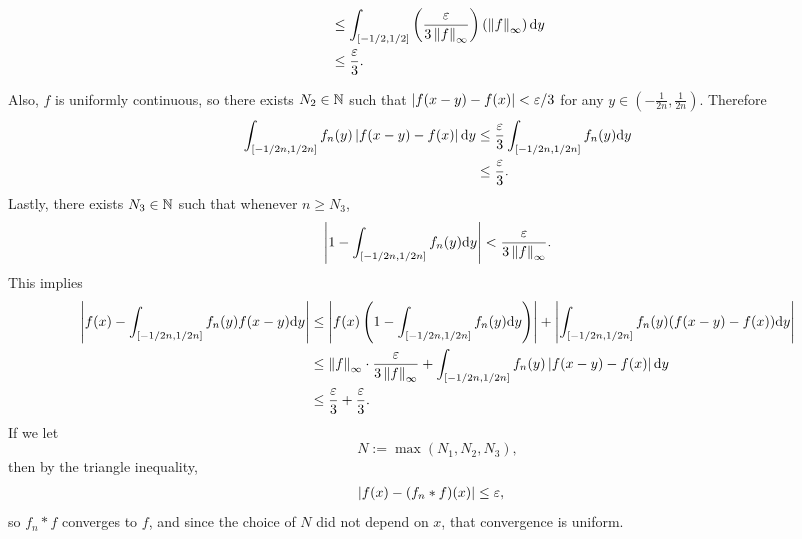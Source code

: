 \documentclass{article}
\begin{document}
\begin{enumerate}[label=(\alph*)]
\begin{align*}
                                                            &\leq \int_{[-1/2,1/2]} \left( \frac{\varepsilon}{3 \left\lVert f\right\rVert_\infty} \right) \left( \left\lVert f\right\rVert_\infty \right) \mathrm{d} y \\
                                                            &\leq \frac{\varepsilon}{3}.
    \end{align*}
    \par
    Also, $f$ is uniformly continuous, so there exists $N_2 \in \mathbb{N}$ such that $\left\lvert f(x-y)-f(x) \right\rvert < \varepsilon / 3$ for any $y \in (- \frac{1}{2n}, \frac{1}{2n})$. Therefore \begin{align*}
        \int_{[-1/2n,1/2n]} f_n(y)\left\lvert f(x-y)-f(x) \right\rvert \mathrm{d} y &\leq \frac{\varepsilon}{3} \int_{[-1/2n,1/2n]} f_n(y) \mathrm{d} y \\
                                                         &\leq \frac{\varepsilon}{3}.
    \end{align*}
    Lastly, there exists $N_3 \in \mathbb{N}$ such that whenever $n \geq N_3$,
    \[ \left\lvert 1 - \int_{[-1/2n,1/2n]} f_n(y) \mathrm{d} y \right\rvert < \frac{\varepsilon}{3 \left\lVert f\right\rVert_\infty}. \]
    This implies \begin{align*}
        \left\lvert f(x)-\int_{[-1/2n,1/2n]} f_n(y)f(x-y) \mathrm{d} y \right\rvert &\leq \left\lvert f(x) \left( 1- \int_{[-1/2n,1/2n]} f_n(y) \mathrm{d} y \right)  \right\rvert + \left\lvert \int_{[-1/2n,1/2n]} f_n(y)(f(x-y)-f(x)) \mathrm{d} y \right\rvert \\
                                                         &\leq \left\lVert f\right\rVert_\infty \cdot \frac{\varepsilon}{3 \left\lVert f\right\rVert_\infty} + \int_{[-1/2n,1/2n]} f_n(y)\left\lvert f(x-y)-f(x) \right\rvert \mathrm{d} y \\
                                                         &\leq \frac{\varepsilon}{3} + \frac{\varepsilon}{3}.
    \end{align*}
    If we let
    \[ N := \max (N_1, N_2, N_3), \]
    then by the triangle inequality, \begin{align*}
        \left\lvert f(x)-(f_n*f)(x) \right\rvert &\leq \varepsilon,
    \end{align*}
    so $f_n*f$ converges to $f$, and since the choice of $N$ did not depend on $x$, that convergence is uniform.
\end{enumerate}
\end{document}
